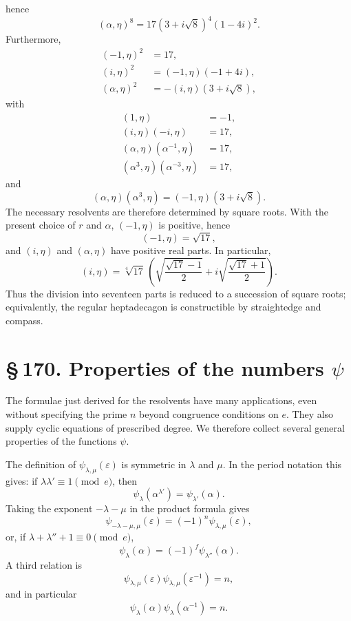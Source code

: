 \documentclass[11pt]{article}
\providecommand{\sect}[2]{\section*{\S\,#1. #2}}
\begin{document}
hence
\[
        (\alpha,
\eta)^8=17(3+i\sqrt8)^4(1-4i)^2.                              \tag{19}
\]
Furthermore,
\[
\begin{aligned}
        (-1,
\eta)^2&=17,\\
        (i,
\eta)^2&=(-1,
\eta)(-1+4i),\\
        (\alpha,
\eta)^2&=-(i,
\eta)(3+i\sqrt8),
\end{aligned}                                                          \tag{20}
\]
with
\[
\begin{aligned}
        (1,
\eta)&=-1,\\
        (i,
\eta)(-i,
\eta)&=17,\\
        (\alpha,
\eta)(\alpha^{-1},
\eta)&=17,\\
        (\alpha^3,
\eta)(\alpha^{-3},
\eta)&=17,
\end{aligned}                                                          \tag{21}
\]
and
\[
        (\alpha,
\eta)(\alpha^3,
\eta)=(-1,
\eta)(3+i\sqrt8).                          \tag{22}
\]
The necessary resolvents are therefore determined by square roots. With the present choice of $r$ and $\alpha$, $(-1,
\eta)$ is positive, hence
\[
        (-1,
\eta)=\sqrt{17},
\]
and $(i,
\eta)$ and $(\alpha,
\eta)$ have positive real parts. In particular,
\[
 (i,
\eta)=\sqrt[4]{17}
 \,\left(
 \sqrt{\frac{\sqrt{17}-1}{2}}+i\sqrt{\frac{\sqrt{17}+1}{2}}
 \right).                                                       \tag{23}
\]
Thus the division into seventeen parts is reduced to a succession of square roots; equivalently, the regular heptadecagon is constructible by straightedge and compass.

\sect{170}{Properties of the numbers $\psi$}

The formulae just derived for the resolvents have many applications, even without specifying the prime $n$ beyond congruence conditions on $e$. They also supply cyclic equations of prescribed degree. We therefore collect several general properties of the functions $\psi$.

The definition of $\psi_{\lambda,
\mu}(\varepsilon)$ is symmetric in $\lambda$ and $\mu$. In the period notation this gives: if $\lambda\lambda'\equiv1\pmod e$, then
\[
        \psi_\lambda(\alpha^{\lambda'})=\psi_{\lambda'}(\alpha).        \tag{1}
\]
Taking the exponent $-\lambda-
\mu$ in the product formula gives
\[
        \psi_{-\lambda-
\mu,
\mu}(\varepsilon)=(-1)^n\psi_{\lambda,
\mu}(\varepsilon),
\]
or, if $\lambda+
\lambda''+1\equiv0\pmod e$,
\[
        \psi_\lambda(\alpha)=(-1)^f\psi_{\lambda''}(\alpha).            \tag{2}
\]
A third relation is
\[
        \psi_{\lambda,
\mu}(\varepsilon)
        \psi_{\lambda,
\mu}(\varepsilon^{-1})=n,                     \tag{3}
\]
and in particular
\[
        \psi_\lambda(\alpha)\psi_\lambda(\alpha^{-1})=n.                \tag{4}
\]
\end{document}
